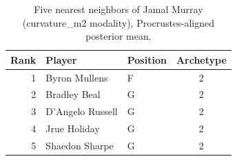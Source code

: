 \begin{table}[htbp]
  \centering\small
  \begin{tabular}{rllc}
    \toprule
    Rank & Player & Position & Archetype \\
    \midrule
    1 & Byron Mullens & F & 2 \\
    2 & Bradley Beal & G & 2 \\
    3 & D'Angelo Russell & G & 2 \\
    4 & Jrue Holiday & G & 2 \\
    5 & Shaedon Sharpe & G & 2 \\
    \bottomrule
  \end{tabular}
  \caption{Five nearest neighbors of Jamal Murray (curvature_m2 modality), Procrustes-aligned posterior mean.}
  \label{tab:Jamal_Murray_neighbors_curvature_m2}
\end{table}


